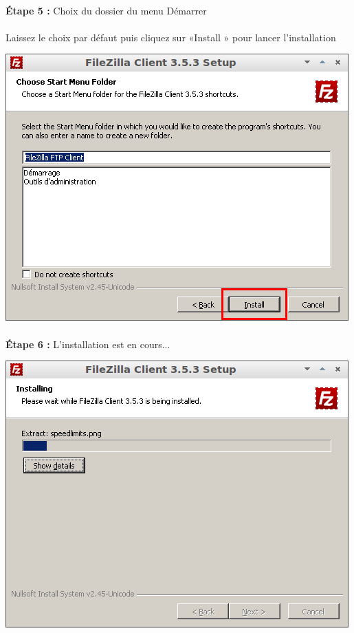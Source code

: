 \documentclass[10pt,a4paper]{article}
\begin{document}
\paragraph{}\textbf{Étape 5 : }Choix du dossier du menu Démarrer
\paragraph{}Laissez le choix par défaut puis cliquez sur «Install » pour lancer l'installation
\begin{center}
\includegraphics[scale=0.5]{img/0020.png}
\end{center}
\paragraph{}\textbf{Étape 6 : }L'installation est en cours...
\begin{center}
\includegraphics[scale=0.5]{img/0021.png}
\end{center}
\end{document}
